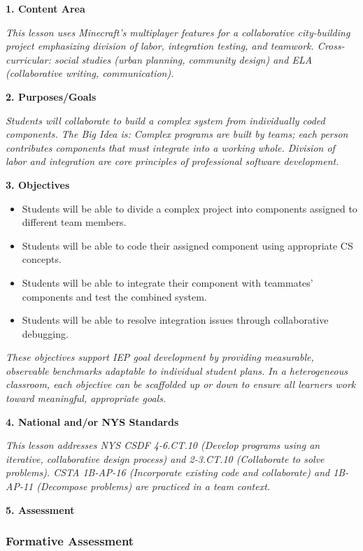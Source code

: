 \documentclass[11pt,letterpaper]{article}
\begin{document}
\textbf{1. Content Area}

\textit{This lesson uses Minecraft's multiplayer features for a collaborative city-building project emphasizing division of labor, integration testing, and teamwork. Cross-curricular: social studies (urban planning, community design) and ELA (collaborative writing, communication).}

\textbf{2. Purposes/Goals}

\textit{Students will collaborate to build a complex system from individually coded components. The Big Idea is: Complex programs are built by teams; each person contributes components that must integrate into a working whole. Division of labor and integration are core principles of professional software development.}

\textbf{3. Objectives}

\begin{itemize}
  \item Students will be able to divide a complex project into components assigned to different team members.

  \item Students will be able to code their assigned component using appropriate CS concepts.

  \item Students will be able to integrate their component with teammates' components and test the combined system.

  \item Students will be able to resolve integration issues through collaborative debugging.
\end{itemize}

\textit{These objectives support IEP goal development by providing measurable, observable benchmarks adaptable to individual student plans. In a heterogeneous classroom, each objective can be scaffolded up or down to ensure all learners work toward meaningful, appropriate goals.}

\textbf{4. National and/or NYS Standards}

\textit{This lesson addresses NYS CSDF 4-6.CT.10 (Develop programs using an iterative, collaborative design process) and 2-3.CT.10 (Collaborate to solve problems). CSTA 1B-AP-16 (Incorporate existing code and collaborate) and 1B-AP-11 (Decompose problems) are practiced in a team context.}

\newpage
\textbf{5. Assessment}

\subsubsection{Formative Assessment}
\end{document}
